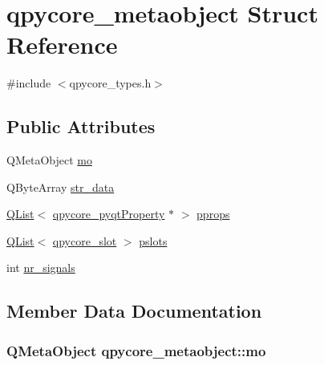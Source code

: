 \hypertarget{structqpycore__metaobject}{}\section{qpycore\+\_\+metaobject Struct Reference}
\label{structqpycore__metaobject}


{\ttfamily \#include $<$qpycore\+\_\+types.\+h$>$}

\subsection*{Public Attributes}
\begin{DoxyCompactItemize}
\item 
Q\+Meta\+Object \hyperlink{structqpycore__metaobject_a7bfb1667278cb9dcce4e0746fcf26d1e}{mo}
\item 
Q\+Byte\+Array \hyperlink{structqpycore__metaobject_a388484a6b53b70bdb199d147f5864a40}{str\+\_\+data}
\item 
\hyperlink{classQList}{Q\+List}$<$ \hyperlink{structqpycore__pyqtProperty}{qpycore\+\_\+pyqt\+Property} $\ast$ $>$ \hyperlink{structqpycore__metaobject_ab7af032bdc563d7603aba3e8ca6b5f39}{pprops}
\item 
\hyperlink{classQList}{Q\+List}$<$ \hyperlink{structqpycore__slot}{qpycore\+\_\+slot} $>$ \hyperlink{structqpycore__metaobject_a8b4dd8cf4538d00159c124161ec6503f}{pslots}
\item 
int \hyperlink{structqpycore__metaobject_aaf6c94a939685782919208c8dd1cba78}{nr\+\_\+signals}
\end{DoxyCompactItemize}


\subsection{Member Data Documentation}
\hypertarget{structqpycore__metaobject_a7bfb1667278cb9dcce4e0746fcf26d1e}{}
\subsubsection[{mo}]{\setlength{\rightskip}{0pt plus 5cm}Q\+Meta\+Object qpycore\+\_\+metaobject\+::mo}\label{structqpycore__metaobject_a7bfb1667278cb9dcce4e0746fcf26d1e}
\hypertarget{structqpycore__metaobject_aaf6c94a939685782919208c8dd1cba78}{}
